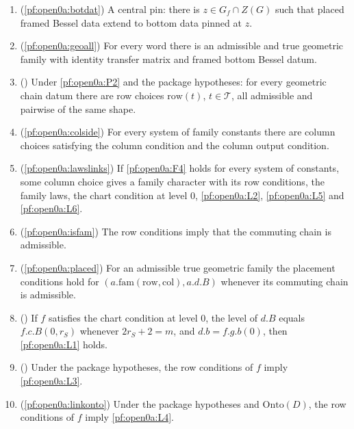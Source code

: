 \begin{enumerate}[label=(F\arabic*),leftmargin=*]
\item\label{pf:open0a:F1} (\cref{pf:open0a:botdat}) A central pin: there is $z\in G_f\cap Z(G)$ such that placed framed
Bessel data extend to bottom data pinned at $z$.
\item\label{pf:open0a:F2} (\cref{pf:open0a:geoall}) For every word there is an admissible and true geometric family with
identity transfer matrix and framed bottom Bessel datum.
\item\label{pf:open0a:F3} () Under \ref{pf:open0a:P2}
and the package hypotheses: for every geometric chain datum there are row choices $\mathrm{row}(t)$,
$t\in\mathcal T$, all admissible and pairwise of the same shape.
\item\label{pf:open0a:F4} (\cref{pf:open0a:colside}) For every system of family constants there are column choices
satisfying the column condition and the column output condition.
\item\label{pf:open0a:F5} (\cref{pf:open0a:lawslinks}) If \ref{pf:open0a:F4} holds for every system of constants, some
column choice gives a family character with its row conditions, the family laws, the chart condition at level $0$,
\ref{pf:open0a:L2}, \ref{pf:open0a:L5} and \ref{pf:open0a:L6}.
\item\label{pf:open0a:F6} (\cref{pf:open0a:isfam}) The row conditions imply that the commuting chain is admissible.
\item\label{pf:open0a:F7} (\cref{pf:open0a:placed}) For an admissible true geometric family the placement conditions
hold for $(a.\mathrm{fam}(\mathrm{row},\mathrm{col}),a.d.B)$ whenever its commuting chain is admissible.
\item\label{pf:open0a:F8} () If $f$ satisfies the chart condition at
level $0$, the level of $d.B$ equals $f.c.B(0,r_S)$ whenever $2r_S+2=m$, and $d.b=f.g.b(0)$, then
\ref{pf:open0a:L1} holds.
\item\label{pf:open0a:F9} () Under the package hypotheses, the row conditions
of $f$ imply \ref{pf:open0a:L3}.
\item\label{pf:open0a:F10} (\cref{pf:open0a:linkonto}) Under the package hypotheses and $\mathrm{Onto}(D)$, the row
conditions of $f$ imply \ref{pf:open0a:L4}.
\end{enumerate}

